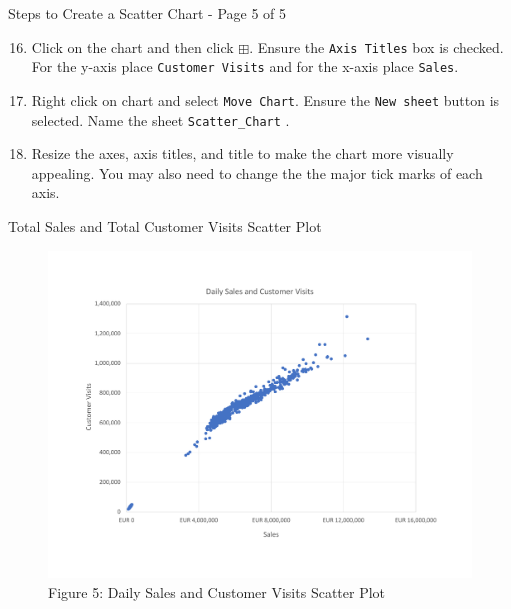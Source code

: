 \documentclass[pdf]{beamer}
\theoremstyle{remark}
\theoremstyle{definition}
\begin{document}
\begin{frame}[t]{Steps to Create a Scatter Chart - Page 5 of 5}
 \small 
\begin{enumerate}
\setcounter{enumi}{15}
\item Click on the chart and then click \texttt{$\boxplus$}. Ensure the \texttt{Axis Titles} box is checked.  For the y-axis place \texttt{Customer Visits} and for the x-axis place \texttt{Sales}. 
\item Right click on chart and select \texttt{Move Chart}.  Ensure the \texttt{New sheet} button is selected. Name the sheet \texttt{Scatter\_Chart} .
\item  Resize the axes, axis titles, and title to make the chart more visually appealing.  You may also need to change the the major tick marks of each axis. 
\end{enumerate}
\end{frame}

\begin{frame}[t]{Total Sales and Total Customer Visits Scatter Plot}
\begin{figure}[htbp]
    \centering
    \captionsetup{justification=centering}
    \includegraphics[clip, trim=0cm 2.3cm 0cm 2.3cm, width=1.0\textwidth]{Scatter_Plot_Unit_3.pdf}  
    \caption{Figure {\color{franklinblue} 5}: Daily Sales and Customer Visits Scatter Plot}
    \label{fig:scatter}
\end{figure}
\end{frame}
\end{document}
